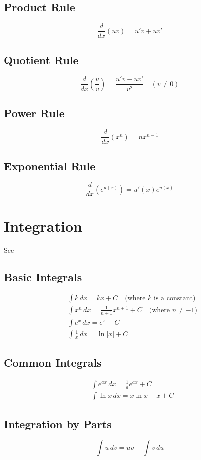 \documentclass[11pt,a4paper]{book}
\theoremstyle{definition}\newtheorem{definition}{Definition}
\theoremstyle{definition}\newtheorem{fact}{Fact}
\theoremstyle{definition}\newtheorem{remark}{Remark}
\theoremstyle{definition}\newtheorem{ex}{Ex.}
\theoremstyle{definition}\newtheorem{project}{Project}
\theoremstyle{definition}\newtheorem{problem}{Problem}
\theoremstyle{definition}\newtheorem{example}{Example}
\numberwithin{theorem}{section}
\numberwithin{corollary}{chapter}
\numberwithin{assumption}{chapter}
\numberwithin{definition}{chapter}
\numberwithin{prop}{chapter}
\numberwithin{notation}{chapter}
\numberwithin{problem}{chapter}
\numberwithin{example}{chapter}
\numberwithin{fact}{chapter}
\numberwithin{ex}{chapter}
\begin{document}
\begin{appendices}
	\subsection*{Product Rule}
	\[
	\frac{d}{dx} (uv) = u'v + uv'
	\]
	
	\subsection*{Quotient Rule}
	\[
	\frac{d}{dx} \left( \frac{u}{v} \right) = \frac{u'v - uv'}{v^2} \quad (v \neq 0)
	\]
	
	\subsection*{Power Rule}
	\[
	\frac{d}{dx} (x^n) = nx^{n-1}
	\]
	
	\subsection*{Exponential Rule}
	\[
	\frac{d}{dx} (e^{u(x)}) = u'(x) e^{u(x)}
	\]
	
	\section{Integration}
	See \citet[Ch. 8]{springcamp}
	\subsection*{Basic Integrals}
	\begin{align*}
		&\int k \, dx = kx + C \quad \text{(where $k$ is a constant)} \\
		&\int x^n \, dx = \frac{1}{n+1} x^{n+1} + C \quad \text{(where $n \neq -1$)} \\
		&\int e^x \, dx = e^x + C \\
		&\int \frac{1}{x} \, dx = \ln |x| + C
	\end{align*}
	
	\subsection*{Common Integrals}
	\begin{align*}
		&\int e^{ax} \, dx = \frac{1}{a} e^{ax} + C \\
		&\int \ln x \, dx = x \ln x - x + C
	\end{align*}
	
	\subsection*{Integration by Parts}
	\[
	\int u \, dv = uv - \int v \, du
	\]
	

\end{appendices}
\end{document}
